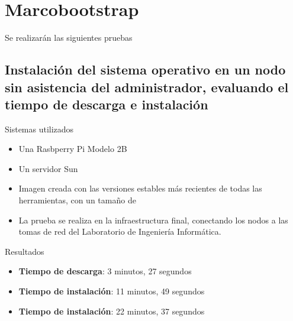 \documentclass{article}
\title{\hmwkTitle}
\author{\textbf{\hmwkAuthorName}}
\date{\hmwkDueDate}
\begin{document}
\maketitle
\begin{abstract}
Una adecuada evaluación de las herramientas, protocolos y arquitectura planteadas debe incluir un conjunto de pruebas en entornos en los que la versión final del sistema debe integrarse. Dichas pruebas deben ser preparadas de antemano.
\end{abstract}


\setcounter{tocdepth}{1}

\tableofcontents
\newpage

\section{Marcobootstrap}

Se realizarán las siguientes pruebas

\subsection*{Instalación del sistema operativo en un nodo sin asistencia del administrador, evaluando el tiempo de descarga e instalación}

Sistemas utilizados
\begin{itemize}
\item Una Rasbperry Pi Modelo 2B
\item Un servidor Sun
\item Imagen creada con las versiones estables más recientes de todas las herramientas, con un tamaño de 
\item La prueba se realiza en la infraestructura final, conectando los nodos a las tomas de red del Laboratorio de Ingeniería Informática.
\end{itemize}

Resultados
\begin{itemize}
\item \textbf{Tiempo de descarga}: 3 minutos, 27 segundos
\item \textbf{Tiempo de instalación}: 11 minutos, 49 segundos
\item \textbf{Tiempo de instalación}: 22 minutos, 37 segundos
\end{itemize}
\end{document}
